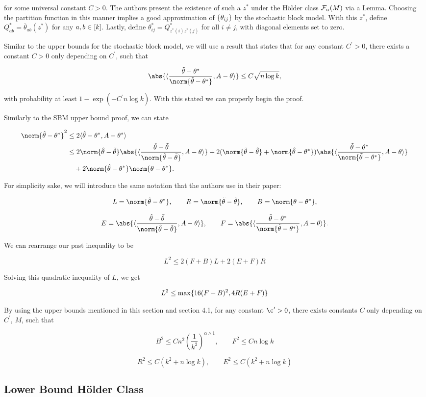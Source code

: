 \documentclass[11pt]{article}
\begin{document}
for some universal constant $C >0$. The authors present the existence of such a $z^\ast$ under the H\"older class $\mathcal{F}_{\alpha}(M)$ via a Lemma. Choosing the partition function in this manner implies a good approximation of $\{\theta_{ij}\}$ by the stochastic block model. With this $z^\ast$, define $Q^\ast_{ab} = \bar{\theta}_{ab}(z^\ast)$ for any $a,b \in \lbrack k\rbrack$. Lastly, define $\theta^\ast_{ij} = Q^\ast_{z^\ast(i)z^\ast(j)}$ for all $i \neq j$, with diagonal elements set to zero.

Similar to the upper bounds for the stochastic block model, we will use a result that states that for any constant $C^\prime > 0$, there exists a constant $C>0$ only depending on $C^\prime$, such that

\[  \abs{\dprod{\frac{\ttheta - \atheta}{\norm{\ttheta-\atheta}}, A-\theta}} \leq C\sqrt{n\log k},  \]

with probability at least $1-\exp(-C^\prime n \log k)$. With this stated we can properly begin the proof.

Similarly to the SBM upper bound proof, we can state

\begin{align*}
    \norm{\htheta - \atheta}^2 & \leq 2\dprod{\htheta - \atheta, A - \atheta} \\
    & \leq 2\norm{\htheta - \ttheta}\abs{\dprod{\frac{\htheta-\ttheta}{\norm{\htheta-\ttheta}},A-\theta}} + 2(\norm{\ttheta-\htheta} + \norm{\htheta-\atheta})\abs{\dprod{\frac{\ttheta-\atheta}{\norm{\ttheta-\atheta}},A-\theta}} \\
    & \quad + 2\norm{\htheta-\atheta}\norm{\theta-\atheta}.
\end{align*}

For simplicity sake, we will introduce the same notation that the authors use in their paper:

\[ L = \norm{\htheta-\atheta}, \qquad R = \norm{\ttheta-\htheta}, \qquad B = \norm{\theta - \atheta},  \]

\[ E = \abs{\dprod{\frac{\htheta-\ttheta}{\norm{\htheta-\ttheta}},A-\theta}}, \qquad F = \abs{\dprod{\frac{\ttheta-\atheta}{\norm{\ttheta-\atheta}},A-\theta}}.  \]

We can rearrange our past inequality to be

\[ L^2 \leq 2(F+B)L + 2(E+F)R   \]

Solving this quadratic inequality of $L$, we get

\[ L^2 \leq \max\{16(F+B)^2, 4R(E+F)\}  \]

By using the upper bounds mentioned in this section and section 4.1, for any constant $\c^\prime >0$, there exists constants $C$ only depending on $C^\prime$, $M$, such that

\[ B^2 \leq Cn^2 \left(\frac{1}{k^2}\right)^{\alpha \wedge 1}, \qquad F^2 \leq Cn\log k   \]

\[ R^2 \leq C(k^2 + n\log k), \qquad E^2 \leq C(k^2 + n\log k)   \]

\subsection{Lower Bound H\"older Class} \label{sec:lower_hold}



\end{document}
